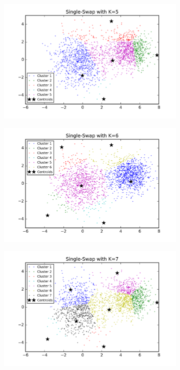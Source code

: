 \begin{figure}[htb]
\begin{subfigure}[b]{0.475\textwidth}
            \includegraphics[width=\textwidth]{./figures/clustering_singleSwap_5.png}
        \end{subfigure}
        \hfill
        \begin{subfigure}[b]{0.475\textwidth}   
            \centering 
            \includegraphics[width=\textwidth]{./figures/clustering_singleSwap_6.png}
        \end{subfigure}
        \begin{subfigure}[b]{0.475\textwidth}   
            \centering 
            \includegraphics[width=\textwidth]{./figures/clustering_singleSwap_7.png}

\end{subfigure}
\end{figure}
